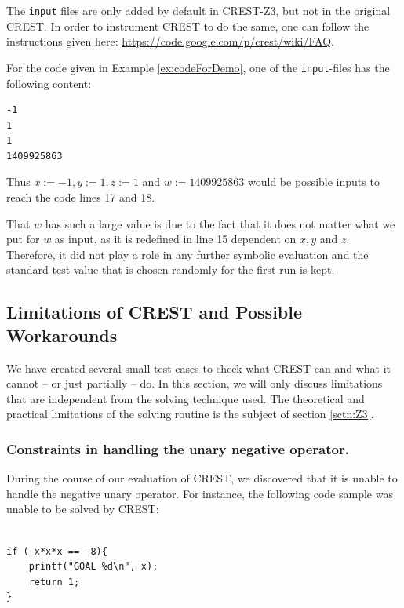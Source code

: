 \documentclass[oribibl]{llncs}
\begin{document}
\begin{remark}
  The \texttt{input} files are only added by default in
  \textsc{CREST-Z3}, but not in the original \textsc{CREST}. In order
  to instrument \textsc{CREST} to do the same, one can follow the
  instructions given here: \url{https://code.google.com/p/crest/wiki/FAQ}.
\end{remark}

For the code given in Example \ref{ex:codeForDemo}, one of the \texttt{input}-files has
the following content:
\begin{verbatim}
-1
1
1
1409925863
\end{verbatim}

Thus $x :=-1, y:=1, z:=1$ and $ w:=1409925863$ would be possible
inputs to reach the code lines 17 and 18.

\begin{remark}
That $w$ has such a large
value is due to the fact that it does not matter what we put for $w$
as input, as it is redefined in line 15 dependent on $x,y$ and
$z$. Therefore, it did not play a role in any further symbolic
evaluation and the standard test value that is chosen randomly for the
first run is kept.
\end{remark}

\subsection{Limitations of \textsc{CREST} and Possible Workarounds}

We have created several small test cases to check what CREST can and
what it cannot -- or just partially -- do. In this section, we will only discuss
limitations that are independent from the solving technique used. The
theoretical and practical limitations of the solving routine is the subject of section \ref{sctn:Z3}.

\subsubsection{Constraints in handling the unary negative operator.}
During the course of our evaluation of CREST, we discovered that it is unable to handle the negative unary operator. For instance, the following code sample was unable to be solved by CREST:

\begin{example}
\begin{verbatim}

if ( x*x*x == -8){
    printf("GOAL %d\n", x);
    return 1;
}
\end{verbatim}
\end{example}
\end{document}

